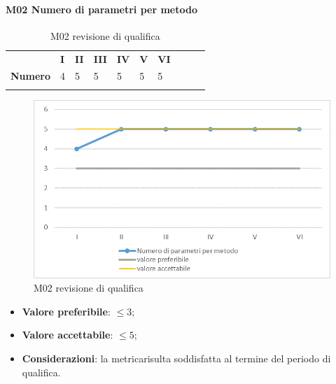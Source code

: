 \paragraph{M02 Numero di parametri per metodo} \mbox{}
\begin{longtable}[H!] {						
		>{}p{50mm}  		
		>{}p{8mm}
		>{}p{8mm}		
		>{}p{8mm}		
		>{}p{8mm}		
		>{}p{8mm}		
		>{}p{8mm}
		>{}p{8mm}
		>{}p{8mm}
		>{}p{8mm}
	}
	\rowcolor{gray!50}
	\textbf{} & \textbf{I} & \textbf{II} & \textbf{III} & \textbf{IV} & \textbf{V} & \textbf{VI} \TBstrut \\ [2mm]
	\textbf{Numero} & 4 & 5 & 5 & 5 & 5 & 5 \TBstrut \\ [2mm]
	\rowcolor{white}
	\caption{M02 revisione di qualifica}
\end{longtable}
\begin{figure}[H] 	
	\includegraphics[width=\linewidth]{./img/grafici/RQ2.png}	
	\caption{M02 revisione di qualifica}	
\end{figure}
\begin{itemize}
	\item \textbf{Valore preferibile}: $\le 3$;
	\item \textbf{Valore accettabile}: $\le 5$;
	\item \textbf{Considerazioni}: la metrica\glosp risulta soddisfatta al termine del periodo di qualifica.
\end{itemize}

